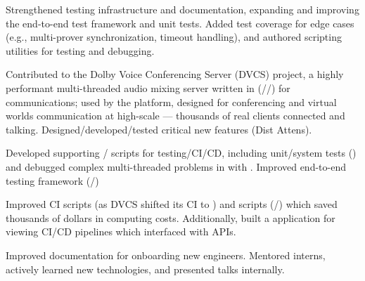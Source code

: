 \documentclass[a4paper]{resume}
\begin{document}
\begin{minipage}[t]{0.66\textwidth}
\begin{tightitemize}
{		      }
		\item {
		            Strengthened testing infrastructure and documentation, expanding and improving the end-to-end test framework and unit tests.
		            Added test coverage for edge cases (e.g., multi-prover synchronization, timeout handling), and authored
		            scripting utilities for testing and debugging.
		      }
	\end{tightitemize}
	\smallsectionspace{}

	\begin{tightitemize}
		\item {
		            Contributed to the Dolby Voice Conferencing Server (DVCS) project, a highly performant multi-threaded
		            audio mixing server written in \cpp{} (\cppstd{}/\conan{}/\cmake{}) for \voip{} communications; used by
		            the \dolbyio{} platform, designed for conferencing and virtual worlds communication at high-scale ---
		            thousands of real clients connected and talking. Designed/developed/tested critical new features (Dist
		            Attens).
		      }
		\item {
		            Developed supporting \python{}/\bash{} scripts for testing/CI/CD, including unit/system tests
		            (\googletest{}) and debugged complex multi-threaded problems in \cpp{} with \gdb{}. Improved \oats{}
		            end-to-end testing framework (\python{}/\asyncio{})
		      }
		\item {
		            Improved CI scripts (as DVCS shifted its CI to \gitlab) and \aws{} scripts (\python/\boto) which saved
		            thousands of dollars in \ectwo{} computing costs. Additionally, built a \nodejs{} \typescript{}
		            application for viewing CI/CD pipelines which interfaced with \gitlab{} \rest{} APIs.
		      }
		\item {
		            Improved documentation for onboarding new engineers. Mentored interns, actively learned new technologies,
		            and presented talks internally.
		      }

\end{tightitemize}
\end{minipage}
\end{document}
